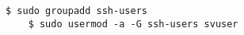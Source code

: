 \begin{lstlisting}[language=term,caption=Ändern des Passworts,label={lst:passwd}]
    $ sudo groupadd ssh-users
    $ sudo usermod -a -G ssh-users svuser
\end{lstlisting}